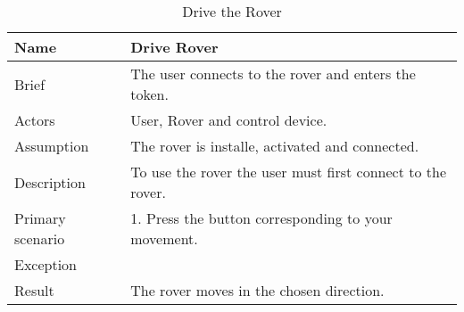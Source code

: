 	\begin{table}[htb]
		\centering
		\caption{Drive the Rover}
		\begin{tabularx}{\textwidth}{|l|X|}
			\hline
			Name             & Drive Rover                                                \\ \hline
			Brief            & The user connects to the rover and enters the token.       \\ \hline
			Actors           & User, Rover and control device.                            \\ \hline
			Assumption       & The rover is installe, activated and connected.            \\ \hline
			Description      & To use the rover the user must first connect to the rover. \\ \hline
			Primary scenario & 1. Press the button corresponding to your movement.        \\ \hline
			Exception        &                                                            \\ \hline
			Result           & The rover moves in the chosen direction.                   \\ \hline
		\end{tabularx}
	\end{table}